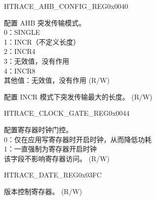 \begin{register}{H}{TRACE\_AHB\_CONFIG\_REG}{0x0040}\label{regdesc:TRACEAHBCONFIGREG}
%
%
%
\regnewline%
\begin{regdesc}\begin{reglist}
\label{fielddesc:TRACEHBURST}\item [TRACE\_HBURST] 配置 AHB 突发传输模式。\\0：SINGLE\\1：INCR（不定义长度）\\2：INCR4\\3：无效值，没有作用\\4：INCR8\\其他值：无效值，没有作用 (R/W)
\label{fielddesc:TRACEMAXINCR}\item [TRACE\_MAX\_INCR] 配置 INCR 模式下突发传输最大的长度。 (R/W)
\end{reglist}\end{regdesc}
\end{register}


\begin{register}{H}{TRACE\_CLOCK\_GATE\_REG}{0x0044}\label{regdesc:TRACECLOCKGATEREG}
%
%
\regnewline%
\begin{regdesc}\begin{reglist}
\label{fielddesc:TRACECLKEN}\item [TRACE\_CLK\_EN] 配置寄存器时钟门控。\\0：仅在应用写寄存器时开启时钟，从而降低功耗\\1：一直强制为寄存器开启时钟\\该字段不影响寄存器访问。 (R/W)
\end{reglist}\end{regdesc}
\end{register}


\begin{register}{H}{TRACE\_DATE\_REG}{0x03FC}\label{regdesc:TRACEDATEREG}
%
%
\regnewline%
\begin{regdesc}\begin{reglist}
\label{fielddesc:TRACEDATE}\item [TRACE\_DATE] 版本控制寄存器。  (R/W)
\end{reglist}\end{regdesc}
\end{register}


